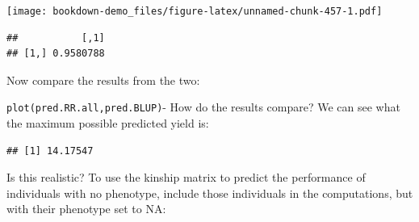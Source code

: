 \documentclass[
]{book}
\newenvironment{Shaded}{\begin{snugshade}}{\end{snugshade}}
\newcommand{\AttributeTok}[1]{\textcolor[rgb]{0.77,0.63,0.00}{#1}}
\newcommand{\ConstantTok}[1]{\textcolor[rgb]{0.00,0.00,0.00}{#1}}
\newcommand{\DecValTok}[1]{\textcolor[rgb]{0.00,0.00,0.81}{#1}}
\newcommand{\FunctionTok}[1]{\textcolor[rgb]{0.00,0.00,0.00}{#1}}
\newcommand{\NormalTok}[1]{#1}
\newcommand{\OtherTok}[1]{\textcolor[rgb]{0.56,0.35,0.01}{#1}}
\newcommand{\SpecialCharTok}[1]{\textcolor[rgb]{0.00,0.00,0.00}{#1}}
\begin{document}
\texttt{[image: bookdown-demo\_files/figure-latex/unnamed-chunk-457-1.pdf]}

\begin{Shaded}
\end{Shaded}

\begin{verbatim}
##           [,1]
## [1,] 0.9580788
\end{verbatim}

Now compare the results from the two:

\texttt{plot(pred.RR.all,pred.BLUP)}- How do the results compare? We can see what the maximum possible predicted yield is:

\begin{Shaded}
\end{Shaded}

\begin{verbatim}
## [1] 14.17547
\end{verbatim}

Is this realistic? To use the kinship matrix to predict the performance of individuals with no phenotype, include those individuals in the computations, but with their phenotype set to NA:

\begin{Shaded}
\end{Shaded}
\end{document}
